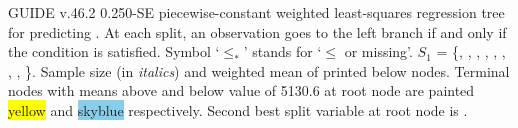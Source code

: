 \documentclass{article}
\begin{document}
GUIDE v.46.2 0.250-SE
piecewise-constant weighted least-squares regression tree
for predicting \texttt{}.
At each split, an observation goes to the left branch 
 if and only if the condition is satisfied.
 Symbol `$\leq_*$' stands for `$\leq$ or missing'.
 $S_{1}$ = \{\texttt{}, \texttt{},
 \texttt{}, \texttt{}, \texttt{},
 \texttt{}, \texttt{}, \texttt{},
 \texttt{}\}.
Sample size (in \emph{italics}) and weighted mean of \texttt{} printed below nodes.
 Terminal nodes with means above and below value of 5130.6 at root node are painted \colorbox{yellow}{yellow} and \colorbox{skyblue}{skyblue} respectively.
 Second best split variable at root node is \texttt{}.
 
\end{document}
